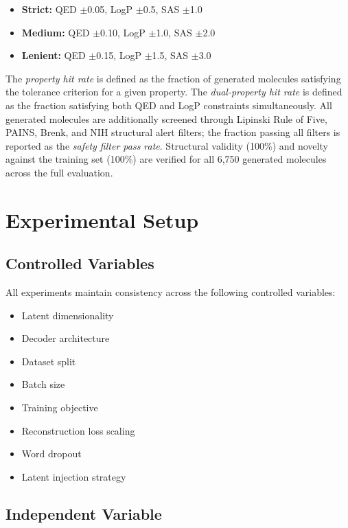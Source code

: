 \documentclass[conference]{IEEEtran}
\begin{document}
\begin{itemize}
    \item \textbf{Strict:} QED $\pm$0.05, LogP $\pm$0.5, SAS $\pm$1.0
    \item \textbf{Medium:} QED $\pm$0.10, LogP $\pm$1.0, SAS $\pm$2.0
    \item \textbf{Lenient:} QED $\pm$0.15, LogP $\pm$1.5, SAS $\pm$3.0
\end{itemize}

The \textit{property hit rate} is defined as the fraction of generated molecules satisfying the tolerance criterion for a given property. The \textit{dual-property hit rate} is defined as the fraction satisfying both QED and LogP constraints simultaneously. All generated molecules are additionally screened through Lipinski Rule of Five, PAINS, Brenk, and NIH structural alert filters; the fraction passing all filters is reported as the \textit{safety filter pass rate}. Structural validity (100\%) and novelty against the training set (100\%) are verified for all 6,750 generated molecules across the full evaluation.

\section{Experimental Setup}

\subsection{Controlled Variables}

All experiments maintain consistency across the following controlled variables:

\begin{itemize}
    \item Latent dimensionality
    \item Decoder architecture
    \item Dataset split
    \item Batch size
    \item Training objective
    \item Reconstruction loss scaling
    \item Word dropout
    \item Latent injection strategy
\end{itemize}

\subsection{Independent Variable}
\end{document}
